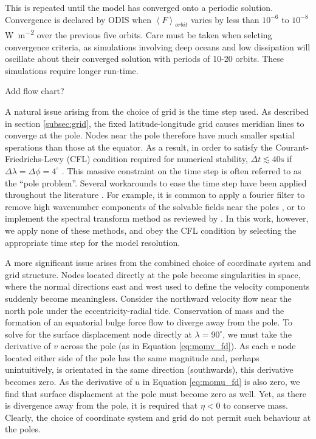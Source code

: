 This is repeated until the model has converged onto a periodic solution. Convergence is declared by ODIS when $\left\langle F \right\rangle_{orbit}$ varies by less than $10^{-6}$ to $10^{-8}$ \si{\watt\per\square\metre} over the previous five orbits. Care must be taken when selcting convergence criteria, as simulations involving deep oceans and low dissipation will oscillate about their converged solution with periods of 10-20 orbits. These simulations require longer run-time.

Add flow chart?

A natural issue arising from the choice of grid is the time step used. As described in section \ref{subsec:grid}, the fixed latitude-longitude grid causes meridian lines to converge at the pole. Nodes near the pole therefore have much smaller spatial sperations than those at the equator. As a result, in order to satisfy the Courant-Friedrichs-Lewy (CFL) condition required for numerical stability, $\Delta t \lesssim 40 \si{\second}$ if $\Delta \lambda = \Delta \phi = 4^{\circ}$ \citep{arakawa1977computational,sears1995tidal}. This massive constraint on the time step is often referred to as the ``pole problem''. Several workarounds to ease the time step have been applied throughout the literature \citep{comblen2009finite}. For example, it is common to apply a fourier filter to remove high wavenumber components of the solvable fields near the poles \citep{murray2002fourier}, or to implement the spectral transform method as reviewed by \citet{swarztrauber1996spectral}. In this work, however, we apply none of these methods, and obey the CFL condition by selecting the appropriate time step for the model resolution.

A more significant issue arises from the combined choice of coordinate system and grid structure. Nodes located directly at the pole become singularities in space, where the normal directions east and west used to define the velocity components suddenly become meaningless. Consider the northward velocity flow near the north pole under the eccentricity-radial tide. Conservation of mass and the formation of an equatorial bulge force flow to diverge away from the pole. To solve for the surface displacement node directly at $\lambda = 90^{\circ}$, we must take the derivative of $v$ across the pole (as in Equation \ref{eq:momv_fd}). As each $v$ node located either side of the pole has the same magnitude and, perhaps unintuitively, is orientated in the same direction (southwards), this derivative becomes zero. As the derivative of $u$ in Equation \ref{eq:momu_fd} is also zero, we find that surface displacment at the pole must become zero as well. Yet, as there is divergence away from the pole, it is required that $\eta < 0$ to conserve mass. Clearly, the choice of coordinate system and grid do not permit such behaviour at the poles. 

